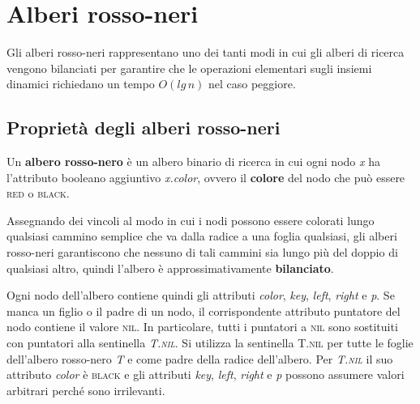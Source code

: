 \documentclass[10pt, a4paper]{report}
\begin{document}
\chapter{Alberi rosso-neri}
Gli alberi rosso-neri rappresentano uno dei tanti modi in cui gli alberi di ricerca vengono bilanciati per garantire che le operazioni elementari sugli insiemi dinamici richiedano un tempo $O(lg\,n)$ nel caso peggiore.
\section{Proprietà degli alberi rosso-neri}
Un \textbf{albero rosso-nero} è un albero binario di ricerca in cui ogni nodo \textit{x} ha l'attributo booleano aggiuntivo \textit{x.color}, ovvero il \textbf{colore} del nodo che può essere \textsc{red} o \textsc{black}.

Assegnando dei vincoli al modo in cui i nodi possono essere colorati lungo qualsiasi cammino semplice che va dalla radice a una foglia qualsiasi, gli alberi rosso-neri garantiscono che nessuno di tali cammini sia lungo più del doppio di qualsiasi altro, quindi l'albero è approssimativamente \textbf{bilanciato}.

Ogni nodo dell'albero contiene quindi gli attributi \textit{color}, \textit{key}, \textit{left}, \textit{right} e \textit{p}. Se manca un figlio o il padre di un nodo, il corrispondente attributo puntatore del nodo contiene il valore \textsc{nil}. In particolare, tutti i puntatori a \textsc{nil} sono sostituiti con puntatori alla sentinella \textit{T.\textsc{nil}}. Si utilizza la sentinella \textsc{T.nil} per tutte le foglie dell'albero rosso-nero \textit{T} e come padre della radice dell'albero. Per \textit{T.\textsc{nil}} il suo attributo \textit{color} è  \textsc{black} e gli attributi \textit{key}, \textit{left}, \textit{right} e \textit{p} possono assumere valori arbitrari perché sono irrilevanti.
\end{document}
